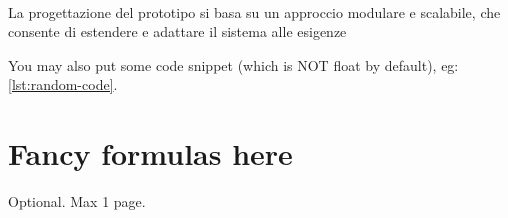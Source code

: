 \documentclass[12pt,a4paper,openright,twoside]{book}
\begin{document}
            \paragraph*{}

            La progettazione del prototipo si basa su un approccio modulare e scalabile, che consente di estendere e adattare il sistema alle esigenze

You may also put some code snippet (which is NOT float by default), eg: \cref{lst:random-code}.


\section{Fancy formulas here}


\backmatter

\nocite{*} %




\begin{acknowledgements} %
Optional. Max 1 page.
\end{acknowledgements}
\end{document}
